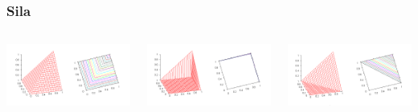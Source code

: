 \documentclass{beamer}
\begin{document}
\begin{frame}
\frametitle{Sila}
\begin{columns}
\begin{minipage}[c][0.4\textheight][c]{\linewidth}
  \centering
  \includegraphics[width=0.9\linewidth]{MinimumTnorm}
\end{minipage}
\begin{minipage}[c][0.4\textheight][c]{\linewidth}
  \centering
  \includegraphics[width=0.9\linewidth]{DrasticTnorm}
\end{minipage}
\begin{minipage}[c][0.4\textheight][c]{\linewidth}
  \centering
  \includegraphics[width=0.9\linewidth]{LukasiewiczTnorm}

\end{minipage}
\end{columns}
\end{frame}
\end{document}
